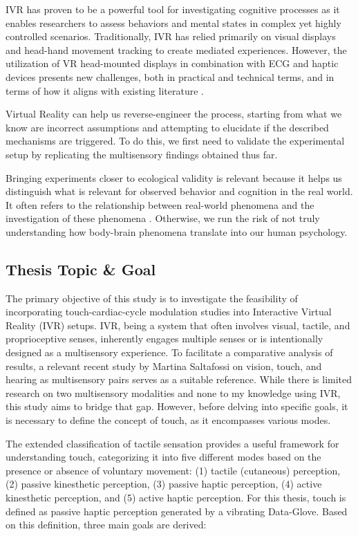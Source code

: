 \documentclass[12pt,oneside,openright]{report}
\begin{document}
IVR has proven to be a powerful tool for investigating cognitive processes as it enables researchers to assess behaviors and mental states in complex yet highly controlled scenarios. Traditionally, IVR has relied primarily on visual displays and head-hand movement tracking to create mediated experiences. However, the utilization of VR head-mounted displays in combination with ECG and haptic devices presents new challenges, both in practical and technical terms, and in terms of how it aligns with existing literature \parencite{Klotzsche2023}.

Virtual Reality can help us reverse-engineer the process, starting from what we know are incorrect assumptions and attempting to elucidate if the described mechanisms are triggered. To do this, we first need to validate the experimental setup by replicating the multisensory findings obtained thus far.

Bringing experiments closer to ecological validity is relevant because it helps us distinguish what is relevant for observed behavior and cognition in the real world. It often refers to the relationship between real-world phenomena and the investigation of these phenomena \parencite{schmuckler2001ecological}. Otherwise, we run the risk of not truly understanding how body-brain phenomena translate into our human psychology.


\subsection*{Thesis Topic \& Goal}

The primary objective of this study is to investigate the feasibility of incorporating touch-cardiac-cycle modulation studies into Interactive Virtual Reality (IVR) setups. IVR, being a system that often involves visual, tactile, and proprioceptive senses, inherently engages multiple senses or is intentionally designed as a multisensory experience. To facilitate a comparative analysis of results, a relevant recent study by Martina Saltafossi on vision, touch, and hearing as multisensory pairs \cite{SALTAFOSSI2023108642} serves as a suitable reference. While there is limited research on two multisensory modalities and none to my knowledge using IVR, this study aims to bridge that gap. However, before delving into specific goals, it is necessary to define the concept of touch, as it encompasses various modes.

The extended classification of tactile sensation \cite{Healy2003HandbookOP} provides a useful framework for understanding touch, categorizing it into five different modes based on the presence or absence of voluntary movement: (1) tactile (cutaneous) perception, (2) passive kinesthetic perception, (3) passive haptic perception, (4) active kinesthetic perception, and (5) active haptic perception. For this thesis, touch is defined as passive haptic perception generated by a vibrating Data-Glove. Based on this definition, three main goals are derived:
\end{document}
